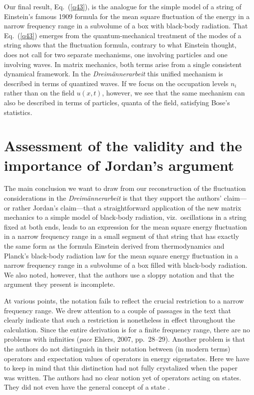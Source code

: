 \documentclass{elsart}
\begin{document}
{Our final result, Eq.\ (\ref{q43}), is the analogue for the simple model of a string of Einstein's famous 1909 formula for the mean square fluctuation of the energy in a narrow frequency range in a subvolume of a box with black-body radiation. That Eq.\ (\ref{q43}) emerges from the quantum-mechanical treatment of the modes of a string shows that the fluctuation formula, contrary to what Einstein thought, does not call for two separate mechanisms, one involving particles and one involving waves. In matrix mechanics, both terms arise from a single consistent dynamical framework. In the {\it Dreim\"annerarbeit} this unified mechanism is described in terms of quantized waves. If we focus on the occupation levels $n_i$ rather than on the field $u(x,t)$, however, we see that the same mechanism can also be described in terms of particles, quanta of the field, satisfying Bose's statistics. 

\section{Assessment of the validity and the importance of Jordan's argument}

The main conclusion we want to draw from our reconstruction of the fluctuation considerations in the {\it Dreim\"annerarbeit} is that they support the authors' claim---or rather Jordan's claim---that a straightforward application of the new matrix mechanics to a simple model of black-body radiation, viz.\ oscillations in a string fixed at both ends, leads to an expression for the mean square energy fluctuation in a narrow frequency range in a small segment of that string that has exactly the same form as the formula Einstein derived from thermodynamics and Planck's black-body radiation law for the mean square energy fluctuation in a narrow frequency range in a subvolume of a box filled with black-body radiation. We also noted, however, that the authors use a sloppy notation and that the argument they present is incomplete. 

At various points, the notation fails to reflect the crucial restriction to a narrow frequency range. We drew attention to a couple of passages in the text that clearly indicate that such a restriction is nonetheless in effect throughout the calculation. Since the entire derivation is for a finite frequency range, there are no problems with infinities ({\it pace} Ehlers,  2007, pp.\ 28--29). Another problem is that the authors do not distinguish in their notation between (in modern terms) operators and expectation values of operators in energy eigenstates. Here we have to keep in mind that this distinction had not fully crystalized when the paper was written. The authors had no clear notion yet of operators acting on states. They did not even have the general concept of a state \citep[sec.\ 3]{Duncan and Janssen}. 


}
\end{document}

